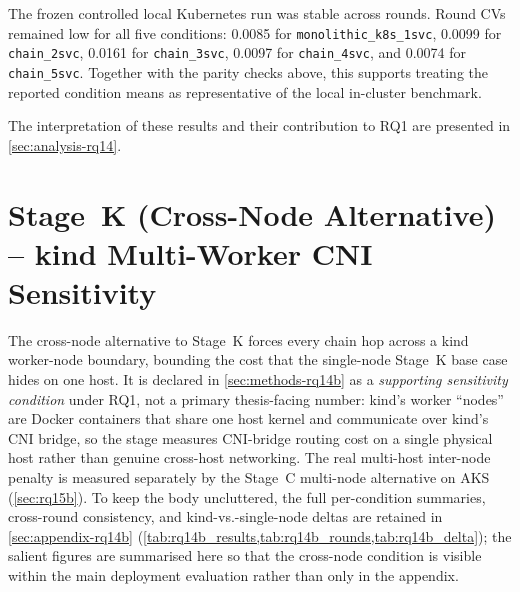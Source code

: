 The frozen controlled local Kubernetes run was stable across rounds. Round CVs
remained low for all five conditions: 0.0085 for \texttt{monolithic\_k8s\_1svc},
0.0099 for \texttt{chain\_2svc}, 0.0161 for \texttt{chain\_3svc}, 0.0097 for
\texttt{chain\_4svc}, and 0.0074 for \texttt{chain\_5svc}. Together with the
parity checks above, this supports treating the reported condition means as
representative of the local in-cluster benchmark.

The interpretation of these results and their contribution to RQ1 are presented in
\cref{sec:analysis-rq14}.

\section{Stage~K (Cross-Node Alternative) -- kind Multi-Worker CNI Sensitivity}
\label{sec:rq14b-stub}

The cross-node alternative to Stage~K forces every chain hop across a kind
worker-node boundary, bounding the cost that the single-node Stage~K base case
hides on one host. It is declared in \cref{sec:methods-rq14b} as a
\emph{supporting sensitivity condition} under RQ1, not a primary thesis-facing
number: kind's worker ``nodes'' are Docker containers that share one host kernel
and communicate over kind's CNI bridge, so the stage measures CNI-bridge routing
cost on a single physical host rather than genuine cross-host networking. The
real multi-host inter-node penalty is measured separately by the Stage~C
multi-node alternative on AKS (\cref{sec:rq15b}). To keep the body uncluttered,
the full per-condition summaries, cross-round consistency, and
kind-vs.-single-node deltas are retained in
\cref{sec:appendix-rq14b}
(\cref{tab:rq14b_results,tab:rq14b_rounds,tab:rq14b_delta}); the salient figures
are summarised here so that the cross-node condition is visible within the main
deployment evaluation rather than only in the appendix.

